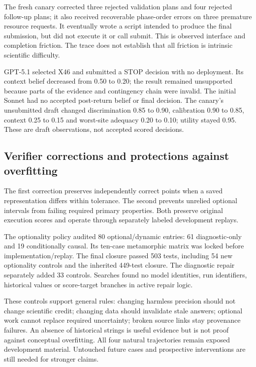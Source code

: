 \documentclass[11pt,a4paper]{article}
\begin{document}
The fresh canary corrected three rejected validation plans and four rejected follow-up plans; it also received recoverable phase-order errors on three premature resource requests. It eventually wrote a script intended to produce the final submission, but did not execute it or call submit. This is observed interface and completion friction. The trace does not establish that all friction is intrinsic scientific difficulty.

GPT-5.1 selected X46 and submitted a STOP decision with no deployment. Its context belief decreased from 0.50 to 0.20; the result remained unsupported because parts of the evidence and contingency chain were invalid. The initial Sonnet had no accepted post-return belief or final decision. The canary's unsubmitted draft changed discrimination 0.85 to 0.90, calibration 0.90 to 0.85, context 0.25 to 0.15 and worst-site adequacy 0.20 to 0.10; utility stayed 0.95. These are draft observations, not accepted scored decisions.

\subsection{Verifier corrections and protections against overfitting}

The first correction preserves independently correct points when a saved representation differs within tolerance. The second prevents unrelied optional intervals from failing required primary properties. Both preserve original execution scores and operate through separately labeled development replays.\cite{c2diag,c2optional}

The optionality policy audited 80 optional/dynamic entries: 61 diagnostic-only and 19 conditionally causal. Its ten-case metamorphic matrix was locked before implementation/replay. The final closure passed 503 tests, including 54 new optionality controls and the inherited 449-test closure. The diagnostic repair separately added 33 controls. Searches found no model identities, run identifiers, historical values or score-target branches in active repair logic.

These controls support general rules: changing harmless precision should not change scientific credit; changing data should invalidate stale answers; optional work cannot replace required uncertainty; broken source links stay provenance failures. An absence of historical strings is useful evidence but is not proof against conceptual overfitting. All four natural trajectories remain exposed development material. Untouched future cases and prospective interventions are still needed for stronger claims.
\end{document}
